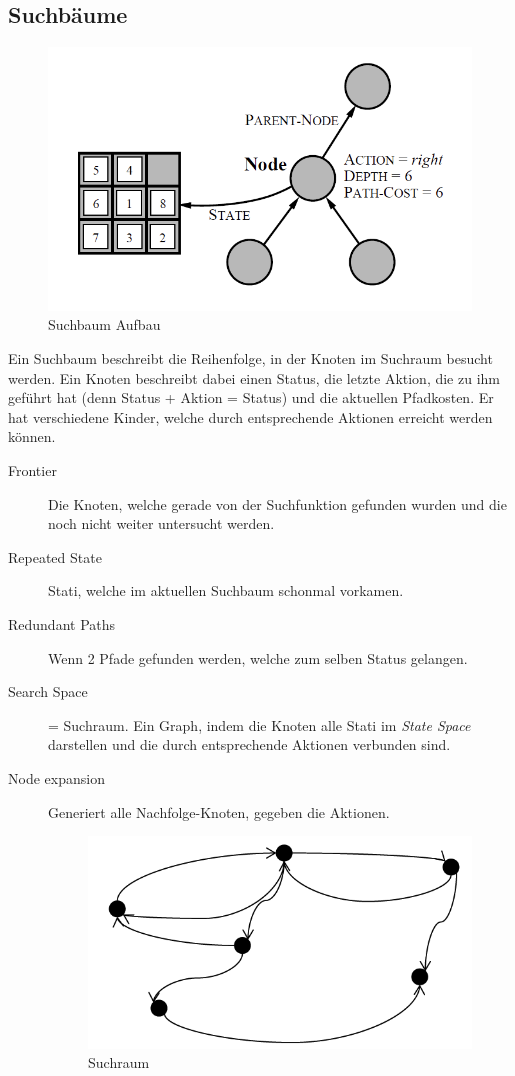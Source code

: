 \subsection{Suchbäume}
\begin{figure}[h!]
	\centering
	\includegraphics[width=0.5\linewidth]{fig/search_tree}
	\caption{Suchbaum Aufbau}
	\label{fig:search_tree}
\end{figure}
Ein Suchbaum beschreibt die Reihenfolge, in der Knoten im Suchraum besucht werden. Ein Knoten beschreibt dabei einen Status, die letzte Aktion, die zu ihm geführt hat (denn Status + Aktion = Status) und die aktuellen Pfadkosten. Er hat verschiedene Kinder, welche durch entsprechende Aktionen erreicht werden können.
\begin{description}
	\item[Frontier] Die Knoten, welche gerade von der Suchfunktion gefunden wurden und die noch nicht weiter untersucht werden.
	\item[Repeated State] Stati, welche im aktuellen Suchbaum schonmal vorkamen.
	\item[Redundant Paths] Wenn 2 Pfade gefunden werden, welche zum selben Status gelangen.
	\item[Search Space] = Suchraum. Ein Graph, indem die Knoten alle Stati im \textit{State Space} darstellen und die durch entsprechende Aktionen verbunden sind.
	\item [Node expansion] Generiert alle Nachfolge-Knoten, gegeben die Aktionen.
	\item []
\begin{figure} [h!]
\centering
\includegraphics[width=0.2\linewidth]{fig/search_space}
\caption{Suchraum}
\label{fig:search_space}
\end{figure}
\end{description}


